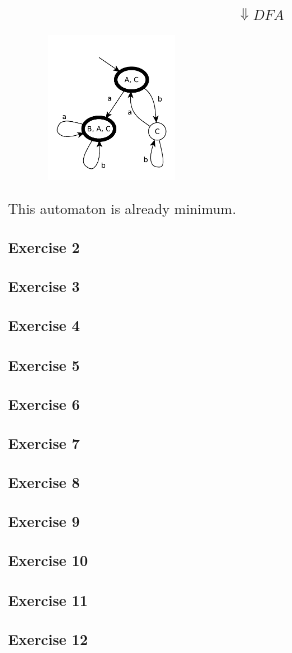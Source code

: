$$
    \Downarrow DFA
$$
\begin{figure}[H]
    \centerline{\includegraphics[width=0.3\textwidth]{img/43.pdf}}
\end{figure}
This automaton is already minimum.

\paragraph{Exercise 2}
\paragraph{Exercise 3}
\paragraph{Exercise 4}
\paragraph{Exercise 5}
\paragraph{Exercise 6}
\paragraph{Exercise 7}
\paragraph{Exercise 8}
\paragraph{Exercise 9}
\paragraph{Exercise 10}
\paragraph{Exercise 11}
\paragraph{Exercise 12}
